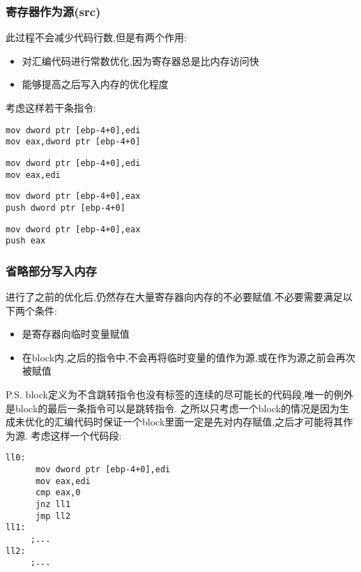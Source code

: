 \documentclass{article}
\begin{document}
\subsubsection{寄存器作为源(src)}

此过程不会减少代码行数,但是有两个作用:
\begin{itemize}
	\item 对汇编代码进行常数优化,因为寄存器总是比内存访问快
    \item 能够提高之后写入内存的优化程度
\end{itemize}

考虑这样若干条指令:

\begin{verbatim}
mov dword ptr [ebp-4+0],edi
mov eax,dword ptr [ebp-4+0]
\end{verbatim}

\begin{verbatim}
mov dword ptr [ebp-4+0],edi
mov eax,edi
\end{verbatim}

\begin{verbatim}
mov dword ptr [ebp-4+0],eax
push dword ptr [ebp-4+0]
\end{verbatim}

\begin{verbatim}
mov dword ptr [ebp-4+0],eax
push eax
\end{verbatim}

\subsubsection{省略部分写入内存}

进行了之前的优化后,仍然存在大量寄存器向内存的不必要赋值.不必要需要满足以下两个条件:

\begin{itemize}
\item 是寄存器向临时变量赋值
\item 在block内,之后的指令中,不会再将临时变量的值作为源,或在作为源之前会再次被赋值
\end{itemize}

P.S. block定义为不含跳转指令也没有标签的连续的尽可能长的代码段,唯一的例外是block的最后一条指令可以是跳转指令.
之所以只考虑一个block的情况是因为生成未优化的汇编代码时保证一个block里面一定是先对内存赋值,之后才可能将其作为源.
考虑这样一个代码段:

\begin{verbatim}
ll0:
      mov dword ptr [ebp-4+0],edi
      mov eax,edi
      cmp eax,0
      jnz ll1
      jmp ll2
ll1:
     ;...
ll2:
     ;...
\end{verbatim}
\end{document}
